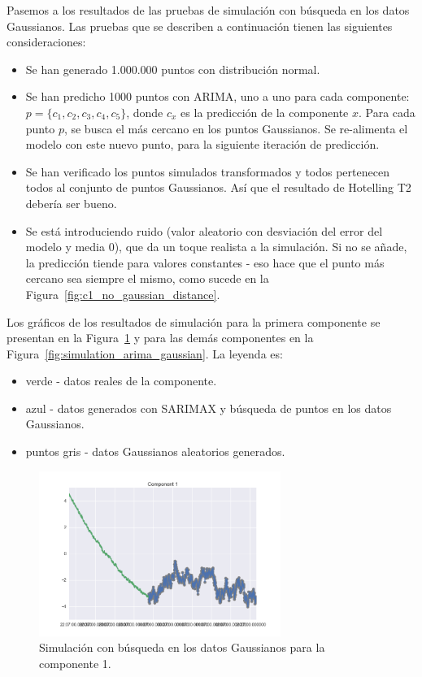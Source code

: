 \documentclass[11pt,spanish,listoffigures,listoftables]{tfgetsinf}
\begin{document}
        Pasemos a los resultados de las pruebas de simulación con búsqueda en los datos Gaussianos. Las pruebas que se describen a continuación tienen las siguientes consideraciones:
        \begin{itemize}
        \item Se han generado 1.000.000 puntos con distribución normal.
        \item Se han predicho 1000 puntos con ARIMA, uno a uno para cada componente: \(p = \{c_{1}, c_{2}, c_{3}, c_{4}, c_{5}\}\), donde \(c_{x}\) es la predicción de la componente \(x\). Para cada punto \(p\), se busca el más cercano en los puntos Gaussianos. Se re-alimenta el modelo con este nuevo punto, para la siguiente iteración de predicción.
        \item Se han verificado los puntos simulados transformados y todos pertenecen todos al conjunto de puntos Gaussianos. Así que el resultado de Hotelling T2 debería ser bueno.
        \item Se está introduciendo ruido (valor aleatorio con desviación del error del modelo y media 0), que da un toque realista a la simulación. Si no se añade, la predicción tiende para valores constantes - eso hace que el punto más cercano sea siempre el mismo, como sucede en la Figura~\ref{fig:c1_no_gaussian_distance}.
        \end{itemize}

	Los gráficos de los resultados de simulación para la primera componente se presentan en la Figura~\ref{fig:c1_simulation_arima_gaussian} y para las demás componentes en la Figura~\ref{fig:simulation_arima_gaussian}. La leyenda es:
	\begin{itemize}
        \item verde -  datos reales de la componente.
	\item azul - datos generados con SARIMAX y búsqueda de puntos en los datos Gaussianos.
	\item puntos gris - datos Gaussianos aleatorios generados.
	\end{itemize}

        \begin{figure}[H]
            \centering
            \includegraphics[width=0.7\textwidth]{c1_simulation_arima_gaussian.png}
            \caption{Simulación con búsqueda en los datos Gaussianos para la componente 1.}
            \label{fig:c1_simulation_arima_gaussian}
        \end{figure}
        
\end{document}
